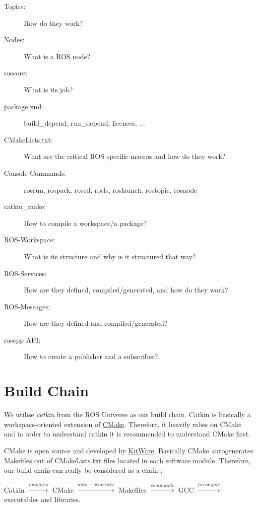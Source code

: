 \begin{description}
  \item [Topics:] How do they work?
  \item [Nodes:] What is a ROS node?
  \item [roscore:] What is its job?
  \item [package.xml:] build\_depend, run\_depend, licences, ...
  \item [CMakeLists.txt:] What are the critical ROS specific macros and how do they work?
  \item [Console Commands:] rosrun, rospack, roscd, rosls, roslaunch, rostopic, rosnode
  \item [catkin\_make:] How to compile a workspace/a package?
  \item [ROS-Workspace:] What is its structure and why is it structured that way?
  \item [ROS-Services:] How are they defined, compiled/generated, and how do they work?
  \item [ROS-Messages:] How are they defined and compiled/generated?
  \item [roscpp API:] How to create a publisher and a subscriber?
\end{description}

\section{Build Chain}
\label{sec:BuildChain}

We utilise \emph{catkin} from the ROS Universe as our build chain. Catkin is basically a workspace-oriented extension of \href{http://www.cmake.org/}{CMake}. Therefore, it heavily relies on CMake and in order to understand catkin it is recommended to understand CMake first.

CMake is open source and developed by \href{http://www.kitware.com/company/about.html}{KitWare}. Basically CMake autogenerates Makefiles out of CMakeLists.txt files located in each software module. Therefore, our build chain can really be considered as a chain \smiley: 

Catkin $\xrightarrow{manages}$ CMake $\xrightarrow{auto-generates}$ Makefiles $\xrightarrow{commands}$ GCC $\xrightarrow{to\ compile}$ executables and libraries.

